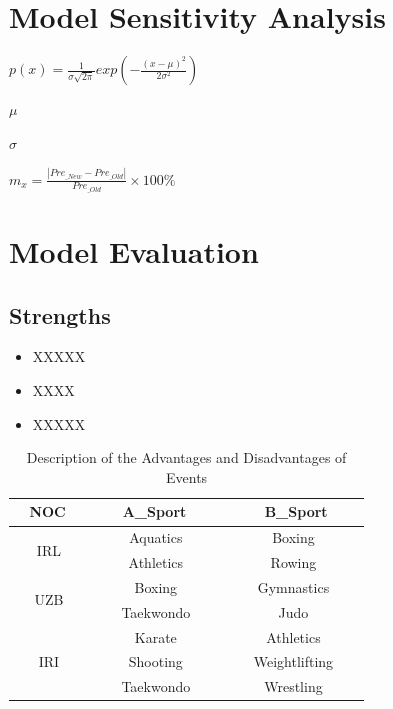 \documentclass{mcmthesis}
\begin{document}
\newpage

\section{Model Sensitivity Analysis}
$p(x)=\frac{1}{\sigma \sqrt{2\pi}}exp(-\frac{(x-\mu)^{2}}{2\sigma ^{2}})$

$\mu$

$\sigma$

$m_{x} = \frac{\left | Pre_{\_New} - Pre_{\_Old}\right |}{Pre_{\_Old}}\times 100\%$

\section{Model Evaluation}
\subsection{Strengths}
\begin{itemize}
\item XXXXX

\item XXXX

\item XXXXX
\end{itemize}

\begin{table}
\centering
\caption{Description of the Advantages and Disadvantages of Events}
\begin{tabular}{|c|c|c|} 
\hline
\textbf{~ NOC~~}     & \textbf{~ ~ A\_Sport~ ~~} & \textbf{~ ~ ~B\_Sport~ ~~}  \\ 
\hline
\multirow{2}{*}{IRL} & Aquatics                  & Boxing                      \\ 
\cline{2-3}
                     & Athletics                 & Rowing                      \\ 
\hline
\multirow{2}{*}{UZB} & Boxing                    & Gymnastics                  \\ 
\cline{2-3}
                     & Taekwondo                 & Judo                        \\ 
\hline
\multirow{3}{*}{IRI} & Karate                    & Athletics                   \\ 
\cline{2-3}
                     & Shooting                  & Weightlifting               \\ 
\cline{2-3}
                     & Taekwondo                 & Wrestling                   \\
\hline
\end{tabular}
\end{table}
\end{document}
